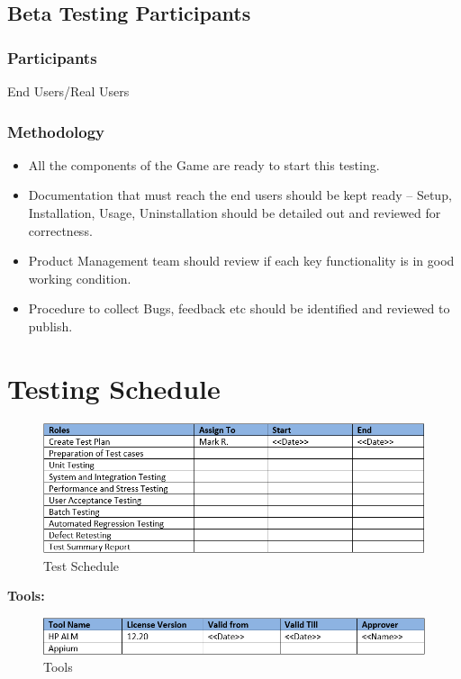\documentclass{article}
\begin{document}
\subsection{Beta Testing Participants}
\subsubsection{Participants}
End Users/Real Users
\subsubsection{Methodology}
\begin{itemize}
    \item All the components of the Game are ready to start this testing.
    \item Documentation that must reach the end users should be kept ready – Setup, Installation, Usage, Uninstallation should be detailed out and reviewed for correctness.
    \item Product Management team should review if each key functionality is in good working condition.
    \item Procedure to collect Bugs, feedback etc should be identified and reviewed to publish.
\end{itemize}

\newpage

\section{Testing Schedule}
\begin{figure}[h]
    \centering
    \includegraphics[scale=0.9]{./images/TestSchedule.PNG}
    \caption{Test Schedule}
    \label{fig:my_label}
\end{figure}
\textbf{Tools:}
\begin{figure}[h]
    \centering
    \includegraphics[scale=0.9]{./images/Tools.PNG}
    \caption{Tools}
    \label{fig:my_label}
\end{figure}
\end{document}
